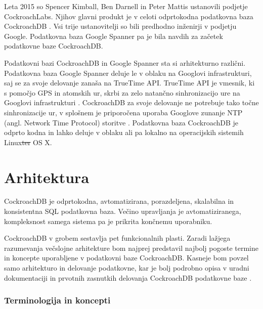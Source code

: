 \documentclass[a4paper, 12pt]{book}
\providecommand{\DIFaddtex}[1]{{\protect\color{blue}\uwave{#1}}} %
\providecommand{\DIFdeltex}[1]{{\protect\color{red}\sout{#1}}}                      %
\providecommand{\DIFaddbegin}{} %
\providecommand{\DIFaddend}{} %
\providecommand{\DIFdelbegin}{} %
\providecommand{\DIFdelend}{} %
\providecommand{\DIFadd}[1]{\texorpdfstring{\DIFaddtex{#1}}{#1}} %
\providecommand{\DIFdel}[1]{\texorpdfstring{\DIFdeltex{#1}}{}} %
\newcommand{\DIFscaledelfig}{0.5}
\newlength{\DIFdelgraphicswidth} %
\newlength{\DIFdelgraphicsheight} %
\newcommand{\DIFaddincludegraphics}[2][]{{\color{blue}\fbox{\DIFOincludegraphics[#1]{#2}}}} %
\newcommand{\DIFdelincludegraphics}[2][]{%
\sbox{\DIFdelgraphicsbox}{\DIFOincludegraphics[#1]{#2}}%
\settoboxwidth{\DIFdelgraphicswidth}{\DIFdelgraphicsbox} %
\settoboxtotalheight{\DIFdelgraphicsheight}{\DIFdelgraphicsbox} %
\scalebox{\DIFscaledelfig}{%
\parbox[b]{\DIFdelgraphicswidth}{\usebox{\DIFdelgraphicsbox}\\[-\baselineskip] \rule{\DIFdelgraphicswidth}{0em}}\llap{\resizebox{\DIFdelgraphicswidth}{\DIFdelgraphicsheight}{%
\setlength{\unitlength}{\DIFdelgraphicswidth}%
\begin{picture}(1,1)%
\thicklines\linethickness{2pt} %
{\color[rgb]{1,0,0}\put(0,0){\framebox(1,1){}}}%
{\color[rgb]{1,0,0}\put(0,0){\line( 1,1){1}}}%
{\color[rgb]{1,0,0}\put(0,1){\line(1,-1){1}}}%
\end{picture}%
}\hspace*{3pt}}} %
} %
\DeclareRobustCommand{\DIFaddbegin}{\DIFOaddbegin \let\includegraphics\DIFaddincludegraphics} %
\DeclareRobustCommand{\DIFaddend}{\DIFOaddend \let\includegraphics\DIFOincludegraphics} %
\DeclareRobustCommand{\DIFdelbegin}{\DIFOdelbegin \let\includegraphics\DIFdelincludegraphics} %
\DeclareRobustCommand{\DIFdelend}{\DIFOaddend \let\includegraphics\DIFOincludegraphics} %
\begin{document}
Leta 2015 so Spencer Kimball, Ben Darnell in Peter Mattis ustanovili podjetje CockroachLabs. Njihov glavni produkt je v celoti odprtokodna podatkovna baza CockroachDB \cite{cockroachdb/cockroach}. Vsi trije ustanovitelji so bili predhodno inženirji v podjetju Google. Podatkovna baza Google Spanner pa je bila navdih za začetek podatkovne baze CockroachDB. \cite{CRDB-2017}

Podatkovni bazi CockroachDB in Google Spanner sta si arhitekturno različni. Podatkovna baza Google Spanner deluje le v oblaku na Googlovi infrastrukturi, saj se za svoje delovanje zanaša na TrueTime API. TrueTime API je vmesnik, ki s pomočjo GPS in atomskih ur, skrbi za zelo natančno sinhronizacijo ure na Googlovi infrastrukturi \cite{Corbett:2013:SGG:2518037.2491245}. CockroachDB za svoje delovanje ne potrebuje tako točne sinhronizacije ur, v splošnem je priporočena uporaba Googlove zunanje NTP (angl. Network Time Protocol) storitve \cite{CRDB-ntpd-configuration}. Podatkovna baza CockroachDB je odprto kodna in lahko deluje v oblaku ali pa lokalno na operacijskih sistemih Linux\DIFdelbegin \DIFdel{ter }\DIFdelend \DIFaddbegin \DIFadd{, Windows in }\DIFaddend OS X.

\section{Arhitektura}

CockroachDB je odprtokodna, avtomatizirana, porazdeljena, skalabilna in konsistentna SQL podatkovna baza. Večino upravljanja je avtomatiziranega, kompleksnost samega sistema pa je prikrita končnemu uporabniku. 

CockroachDB v grobem sestavlja pet funkcionalnih plasti. Zaradi lažjega razumevanja večslojne arhitekture bom najprej predstavil najbolj pogoste termine in koncepte uporabljene v podatkovni baze CockroachDB. Kasneje bom povzel samo arhitekturo in delovanje podatkovne, kar je bolj podrobno opisa v uradni dokumentaciji \cite{CRDB-home} in prvotnih zasnutkih delovanja CockroachDB podatkovne baze \cite{CRDB-design}.

\subsubsection{Terminologija in koncepti}
\end{document}
